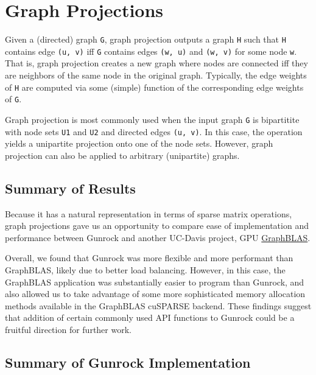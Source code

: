 \documentclass[10pt,oneside]{memoir}
\begin{document}
\hypertarget{graph-projections-1}{%
\chapter{Graph Projections}\label{graph-projections-1}}

Given a (directed) graph \texttt{G}, graph projection outputs a graph
\texttt{H} such that \texttt{H} contains edge \texttt{(u,\ v)} iff
\texttt{G} contains edges \texttt{(w,\ u)} and \texttt{(w,\ v)} for some
node \texttt{w}. That is, graph projection creates a new graph where
nodes are connected iff they are neighbors of the same node in the
original graph. Typically, the edge weights of \texttt{H} are computed
via some (simple) function of the corresponding edge weights of
\texttt{G}.

Graph projection is most commonly used when the input graph \texttt{G}
is bipartitite with node sets \texttt{U1} and \texttt{U2} and directed
edges \texttt{(u,\ v)}. In this case, the operation yields a unipartite
projection onto one of the node sets. However, graph projection can also
be applied to arbitrary (unipartite) graphs.

\hypertarget{summary-of-results-6}{%
\section{Summary of Results}\label{summary-of-results-6}}

Because it has a natural representation in terms of sparse matrix
operations, graph projections gave us an opportunity to compare ease of
implementation and performance between Gunrock and another UC-Davis
project, GPU \href{https://github.com/owensgroup/GraphBLAS}{GraphBLAS}.

Overall, we found that Gunrock was more flexible and more performant
than GraphBLAS, likely due to better load balancing. However, in this
case, the GraphBLAS application was substantially easier to program than
Gunrock, and also allowed us to take advantage of some more
sophisticated memory allocation methods available in the GraphBLAS
cuSPARSE backend. These findings suggest that addition of certain
commonly used API functions to Gunrock could be a fruitful direction for
further work.

\hypertarget{summary-of-gunrock-implementation-5}{%
\section{Summary of Gunrock
Implementation}\label{summary-of-gunrock-implementation-5}}
\end{document}
